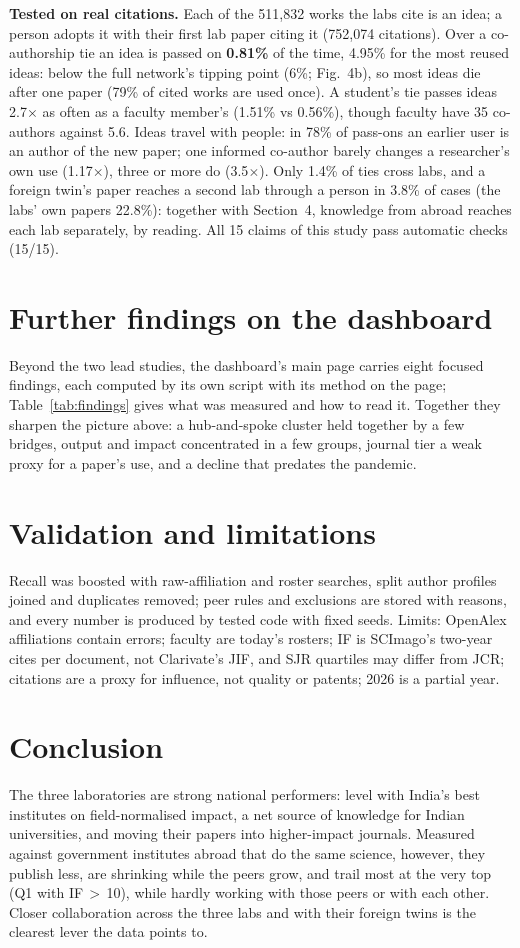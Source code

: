 \documentclass[10pt,a4paper,twocolumn]{article}
\begin{document}
\textbf{Tested on real citations.} Each of the 511,832 works the labs cite is an idea; a person adopts it with their first lab paper citing it (752,074 citations). Over a co-authorship tie an idea is passed on \textbf{0.81\%} of the time, 4.95\% for the most reused ideas: below the full network's tipping point (6\%; Fig.~4b), so most ideas die after one paper (79\% of cited works are used once). A student's tie passes ideas 2.7$\times$ as often as a faculty member's (1.51\% vs 0.56\%), though faculty have 35 co-authors against 5.6. Ideas travel with people: in 78\% of pass-ons an earlier user is an author of the new paper; one informed co-author barely changes a researcher's own use (1.17$\times$), three or more do (3.5$\times$). Only 1.4\% of ties cross labs, and a foreign twin's paper reaches a second lab through a person in 3.8\% of cases (the labs' own papers 22.8\%): together with Section~4, knowledge from abroad reaches each lab separately, by reading. All 15 claims of this study pass automatic checks (15/15).

\section{Further findings on the dashboard}
Beyond the two lead studies, the dashboard's main page carries eight focused findings, each computed by its own script with its method on the page; Table~\ref{tab:findings} gives what was measured and how to read it. Together they sharpen the picture above: a hub-and-spoke cluster held together by a few bridges, output and impact concentrated in a few groups, journal tier a weak proxy for a paper's use, and a decline that predates the pandemic.



\section{Validation and limitations}
Recall was boosted with raw-affiliation and roster searches, split author profiles joined and duplicates removed; peer rules and exclusions are stored with reasons, and every number is produced by tested code with fixed seeds. Limits: OpenAlex affiliations contain errors; faculty are today's rosters; IF is SCImago's two-year cites per document, not Clarivate's JIF, and SJR quartiles may differ from JCR; citations are a proxy for influence, not quality or patents; 2026 is a partial year.

\section{Conclusion}
The three laboratories are strong national performers: level with India's best institutes on field-normalised impact, a net source of knowledge for Indian universities, and moving their papers into higher-impact journals. Measured against government institutes abroad that do the same science, however, they publish less, are shrinking while the peers grow, and trail most at the very top (Q1 with IF\,$>$\,10), while hardly working with those peers or with each other. Closer collaboration across the three labs and with their foreign twins is the clearest lever the data points to.
\end{document}
